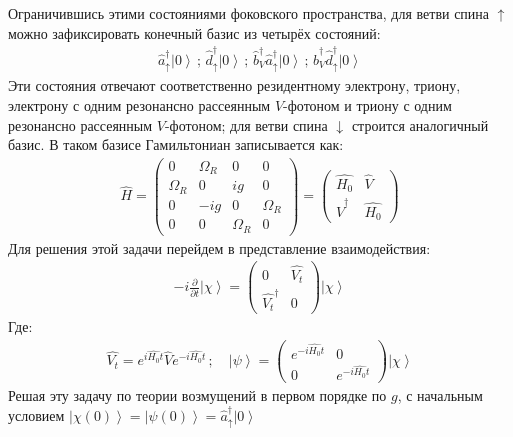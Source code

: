 \documentclass[11pt]{article}    %
\numberwithin{equation}{section}
\begin{document}
Ограничившись этими состояниями фоковского пространства, для ветви
спина $\uparrow$ можно зафиксировать конечный базис из четырёх
состояний:
\begin{gather}
    \hat{a}^{\dag}_{\uparrow} \left| 0 \right\rangle \, ; \, \hat{d}^{\dag}_{\uparrow} \left| 0 \right\rangle \, ; \, \hat{b}^{\dag}_{V} \hat{a}^{\dag}_{\uparrow} \left| 0 \right\rangle \, ; \, \hat{b}^{\dag}_{V} \hat{d}^{\dag}_{\uparrow} \left| 0 \right\rangle
\end{gather}
Эти состояния отвечают соответственно резидентному электрону,
триону, электрону с одним резонансно рассеянным $V$-фотоном и
триону с одним резонансно рассеянным $V$-фотоном;
для ветви спина $\downarrow$ строится
аналогичный базис.
В таком базисе Гамильтониан записывается как:
\begin{gather}
    \hat{H} =
\begin{pmatrix}
    0 & \Omega_R & 0 & 0 \\
    \Omega_R & 0 & ig & 0 \\
    0 & -ig & 0 & \Omega_R \\
    0 & 0 & \Omega_R & 0
\end{pmatrix}
     =
\begin{pmatrix}
    \hat{H_0} & \hat{V} \\
    \hat{V}^{\dag} & \hat{H_0}
\end{pmatrix}
\end{gather}
Для решения этой задачи перейдем в представление взаимодействия:
\begin{gather}
    -i \frac{\partial}{\partial t } \left| \chi \right\rangle =
\begin{pmatrix}
    0 &  \hat{V_t} \\
     \hat{V_t}^{\dag} & 0
\end{pmatrix}
    \left| \chi \right\rangle \end{gather}
Где:
\begin{gather}
    \hat{V_t} = e^{i\hat{H_0}t} \hat{V} e^{-i\hat{H_0}t} \, ; \quad
    \left| \psi \right\rangle =
\begin{pmatrix}
    e^{-i\hat{H_0}t} & 0 \\
    0 & e^{-i\hat{H_0}t}
\end{pmatrix}
    \left| \chi \right\rangle
\end{gather}
Решая эту задачу по теории возмущений в первом порядке по $g$,
с начальным условием
$\left| \chi(0) \right\rangle = \left| \psi(0) \right\rangle = \hat{a}^{\dag}_{\uparrow} \left| 0 \right\rangle$
\end{document}
